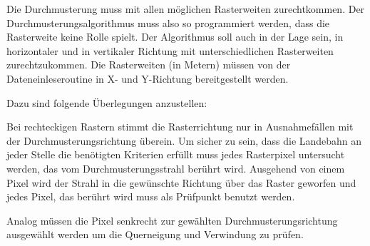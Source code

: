 \documentclass[
11pt, %
a4paper, %
oneside, %
pdfspacing, %
headinclude,
BCOR5mm, %
ngerman, %
bibtotocnumbered,
]{scrartcl}
\begin{document}
	Die Durchmusterung muss mit allen möglichen Rasterweiten zurechtkommen. Der Durchmusterungsalgorithmus muss also so programmiert werden, dass die Rasterweite keine Rolle spielt. Der Algorithmus soll auch in der Lage sein, in horizontaler und in vertikaler Richtung mit unterschiedlichen Rasterweiten zurechtzukommen. Die Rasterweiten (in Metern) müssen von der Dateneinleseroutine in X- und Y-Richtung bereitgestellt werden.

	Dazu sind folgende Überlegungen anzustellen:
	
 	\begin{minipage}{\textwidth}
 		\skippingparagraph
 		
		\begin{minipage}[t]{\textwidth-4cm}
			\vspace{0pt}
			Bei rechteckigen Rastern stimmt die Rasterrichtung nur in Ausnahmefällen mit der Durchmusterungsrichtung überein. Um sicher zu sein, dass die Landebahn an jeder Stelle die benötigten Kriterien erfüllt muss jedes Rasterpixel untersucht werden, das vom Durchmusterungsstrahl berührt wird. Ausgehend von einem Pixel wird der Strahl in die gewünschte Richtung über das Raster geworfen und jedes Pixel, das berührt wird muss als Prüfpunkt benutzt werden.
			
			Analog müssen die Pixel senkrecht zur gewählten Durchmusterungsrichtung ausgewählt werden um die Querneigung und Verwindung zu prüfen.
			

\end{minipage}
\end{minipage}
\end{document}
